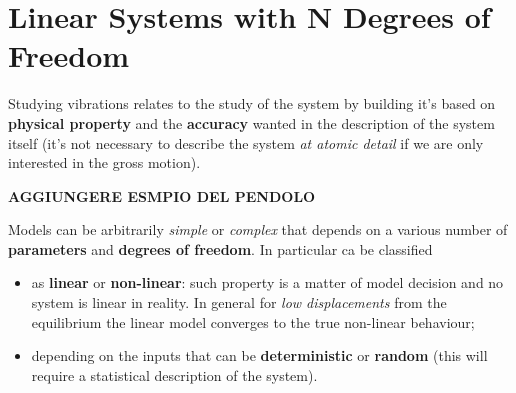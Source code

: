 \chapter{Linear Systems with N Degrees of Freedom}
	Studying vibrations relates to the study of the system by building it's  based on \textbf{physical property} and the \textbf{accuracy} wanted in the description of the system itself (it's not necessary to describe the system \textit{at atomic detail} if we are only interested in the gross motion).
	
	\textbf{AGGIUNGERE ESMPIO DEL PENDOLO}
	
	Models can be arbitrarily \textit{simple} or \textit{complex} that depends on a various number of \textbf{parameters} and \textbf{degrees of freedom}. In particular  ca be classified
	\begin{itemize}
		\item as \textbf{linear} or \textbf{non-linear}: such property is a matter of model decision and no system is linear in reality. In general for \textit{low displacements} from the equilibrium the linear model converges to the true non-linear behaviour;
		
		\item depending on the inputs that can be \textbf{deterministic} or \textbf{random} (this will require a statistical description of the system).
	\end{itemize}
	
	
	
	
	
	
	
	
	
	
	
	
	
	
	
	
	
	
	
	
	
	
	
	
	
	
	
	
	
	
	
